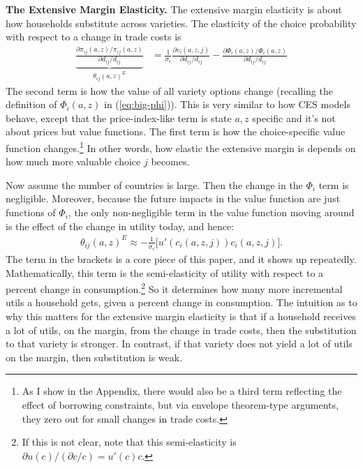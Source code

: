 \documentclass[12pt,pdftex]{article}
\begin{document}
\begin{onehalfspacing}
\textbf{The Extensive Margin Elasticity.} The extensive margin elasticity is about how households substitute across varieties. The elasticity of the choice probability with respect to a change in trade costs is
\begin{align}
\underbrace{ \frac{\partial \pi_{ij}(a,z) / \pi_{ij}(a,z)}{\partial d_{ij} / d_{ij}} }_{\theta_{ij}(a,z)^{E}} &=
 \frac{1}{\sigma_{\epsilon}}\frac{\partial v_{i}(a,z,j)}{\partial d_{ij}/d_{ij}} - \frac{\partial \Phi_{i}(a,z) / \Phi_{i}(a,z)}{\partial d_{ij}/d_{ij}}
\label{eq:extensive-margin}
\end{align}
The second term is how the value of all variety options change (recalling the definition of $\Phi_{i}(a,z)$  in (\ref{eq:big-phi})). This is very similar to how CES models behave, except that the price-index-like term is state $a,z$ specific and it's not about prices but value functions. The first term is how the choice-specific value function changes.\footnote{As I show in the Appendix, there would also be a third term reflecting the effect of borrowing constraints, but via envelope theorem-type arguments, they zero out for small changes in trade costs.} In other words, how elastic the extensive margin is depends on how much more valuable choice $j$ becomes.

Now assume the number of countries is large. Then the change in the $\Phi_{i}$ term is negligible. Moreover, because the future impacts in the value function are just functions of $\Phi_{i}$, the only non-negligible term in the value function moving around is the effect of the change in utility today, and hence:
\begin{align}
\theta_{ij}(a,z)^{E} \approx -\frac{1}{\sigma_{\epsilon}}\bigg[u'(c_{i}(a,z,j))c_{i}(a,z,j)\bigg]. \label{eq:extensive-margin-large}
\end{align}
The term in the brackets is a core piece of this paper, and it shows up repeatedly. Mathematically, this term is the semi-elasticity of utility with respect to a percent change in consumption.\footnote{If this is not clear, note that this semi-elasticity is $ \partial u(c) / ( \partial c / c) = u'(c)c $.} So it determines how many more incremental utils a household gets, given a percent change in consumption. The intuition as to why this matters for the extensive margin elasticity is that if a household receives a lot of utils, on the margin, from the change in trade costs, then the substitution to that variety is stronger. In contrast, if that variety does not yield a lot of utils on the margin, then substitution is weak.


\end{onehalfspacing}
\end{document}
